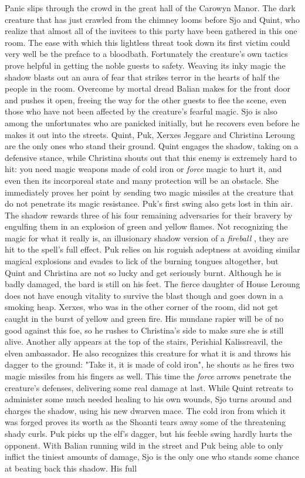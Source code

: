 Panic slips through the crowd in the great hall of the Carowyn Manor. The dark creature that has just crawled from the chimney looms before Sjo and Quint, who realize that almost all of the invitees to this party have been gathered in this one room. The ease with which this lightless threat took down its first victim could very well be the preface to a bloodbath. Fortunately the creature's own tactics prove helpful in getting the noble guests to safety. Weaving its inky magic the shadow blasts out an aura of fear that strikes terror in the hearts of half the people in the room. Overcome by mortal dread Balian makes for the front door and pushes it open, freeing the way for the other guests to flee the scene, even those who have not been affected by the creature's fearful magic. Sjo is also among the unfortunates who are panicked initially, but he recovers even before he makes it out into the streets. Quint, Puk, Xerxes Jeggare and Christina Leroung are the only ones who stand their ground. Quint engages the shadow, taking on a defensive stance, while Christina shouts out that this enemy is extremely hard to hit: you need magic weapons made of cold iron or {\itshape force} magic to hurt it, and even then its incorporeal state and many protection will be an obstacle. She immediately proves her point by sending two magic missiles at the creature that do not penetrate its magic resistance. Puk's first swing also gets lost in thin air. The shadow rewards three of his four remaining adversaries for their bravery by engulfing them in an explosion of green and yellow flames. Not recognizing the magic for what it really is, an illusionary shadow version of a {\itshape fireball} , they are hit to the spell's full effect. Puk relies on his roguish adeptness at avoiding similar magical explosions and evades to lick of the burning tongues altogether, but Quint and Christina are not so lucky and get seriously burnt. Although he is badly damaged, the bard is still on his feet. The fierce daughter of House Leroung does not have enough vitality to survive the blast though and goes down in a smoking heap. Xerxes, who was in the other corner of the room, did not get caught in the burst of yellow and green fire. His mundane rapier will be of no good against this foe, so he rushes to Christina's side to make sure she is still alive. Another ally appears at the top of the stairs, Perishial Kalissreavil, the elven ambassador. He also recognizes this creature for what it is and throws his dagger to the ground: "Take it, it is made of cold iron", he shouts as he fires two magic missiles from his fingers as well. This time the  {\itshape force} arrows penetrate the creature's defenses, delivering some real damage at last. While Quint retreats to administer some much needed healing to his own wounds, Sjo turns around and charges the shadow, using his new dwarven mace. The cold iron from which it was forged proves its worth as the Shoanti tears away some of the threatening shady curls. Puk picks up the elf's dagger, but his feeble swing hardly hurts the opponent. With Balian running wild in the street and Puk being able to only inflict the tiniest amounts of damage, Sjo is the only one who stands some chance at beating back this shadow. His full 